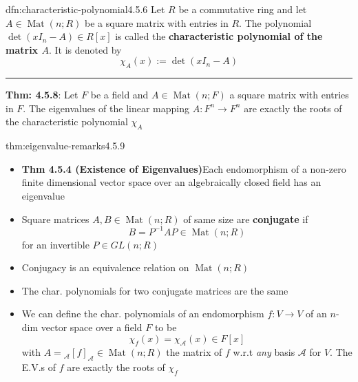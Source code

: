 \documentclass[landscape, 8pt]{extarticle}
\DeclareMathOperator{\Mat}{Mat}
\begin{document}
\begin{multicols}{3}
\vspace{-5pt}
\begin{dfn}{dfn:characteristic-polynomial}{4.5.6}
    Let $R$ be a commutative ring and let $A\in \Mat(n;R)$ be a square matrix with entries in $R$. The polynomial $\det(x I_{n} - A)\in R[x]$ is called the \textbf{characteristic polynomial of the matrix $A$}. It is denoted by
    \[\chi_{A}(x) := \det(x I_{n} - A)\]

    \noindent\rule{\textwidth}{0.2pt}
    \textbf{Thm: 4.5.8}: Let $F$ be a field and $A\in \Mat(n;F)$ a square matrix with entries in $F$. The eigenvalues of the linear mapping $A : F^{n}\to F^{n}$ are exactly the roots of the characteristic polynomial $\chi_{A}$
\end{dfn}

\vspace{-5pt}
\begin{thm}{thm:eigenvalue-remarks}{4.5.9}
    \vspace{-5pt}
    \begin{itemize}[leftmargin=*]
        \setlength\itemsep{0em}

        \item \textbf{Thm 4.5.4 (Existence of Eigenvalues)}Each endomorphism of a non-zero finite dimensional vector space over an algebraically closed field has an eigenvalue
        \item Square matrices $A, B\in \Mat(n;R)$ of same size are \textbf{conjugate} if
            \[B = P^{-1}AP\in \Mat(n; R)\]
            for an invertible $P\in GL(n;R)$
        \item Conjugacy is an equivalence relation on $\Mat(n;R)$
        \item The char. polynomials for two conjugate matrices are the same
        \item We can define the char. polynomials of an endomorphism $f : V\to V$ of an $n$-dim vector space over a field $F$ to be
            \[\chi_{f}(x) = \chi_{\mathcal{A}}(x)\in F[x]\]
            with $A = {}_{\mathcal{A}}[f]_{\mathcal{A}}\in \Mat(n;R)$ the matrix of $f$ w.r.t \textit{any} basis $\mathcal{A}$ for $V$. The E.V.s of $f$ are exactly the roots of $\chi_{f}$
    \end{itemize}
\end{thm}


\end{multicols}
\end{document}
